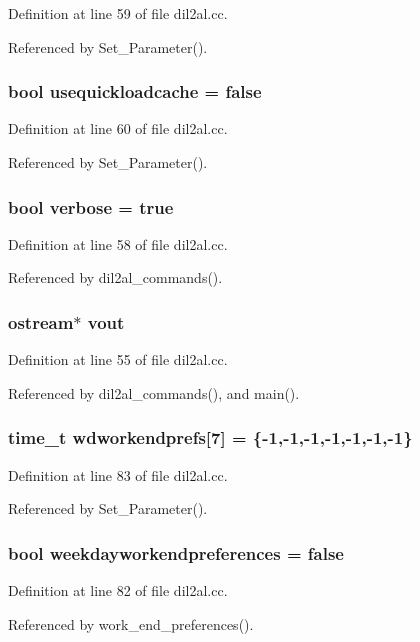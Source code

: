 Definition at line 59 of file dil2al.cc.

Referenced by Set\_\-Parameter().
\subsubsection{\setlength{\rightskip}{0pt plus 5cm}bool usequickloadcache = {\bf false}}\label{dil2al_8cc_a41}




Definition at line 60 of file dil2al.cc.

Referenced by Set\_\-Parameter().
\subsubsection{\setlength{\rightskip}{0pt plus 5cm}bool verbose = {\bf true}}\label{dil2al_8cc_a32}




Definition at line 58 of file dil2al.cc.

Referenced by dil2al\_\-commands().
\subsubsection{\setlength{\rightskip}{0pt plus 5cm}ostream$\ast$ vout}\label{dil2al_8cc_a29}




Definition at line 55 of file dil2al.cc.

Referenced by dil2al\_\-commands(), and main().
\subsubsection{\setlength{\rightskip}{0pt plus 5cm}time\_\-t wdworkendprefs[7] = \{-1,-1,-1,-1,-1,-1,-1\}}\label{dil2al_8cc_a65}




Definition at line 83 of file dil2al.cc.

Referenced by Set\_\-Parameter().
\subsubsection{\setlength{\rightskip}{0pt plus 5cm}bool weekdayworkendpreferences = {\bf false}}\label{dil2al_8cc_a64}




Definition at line 82 of file dil2al.cc.

Referenced by work\_\-end\_\-preferences().